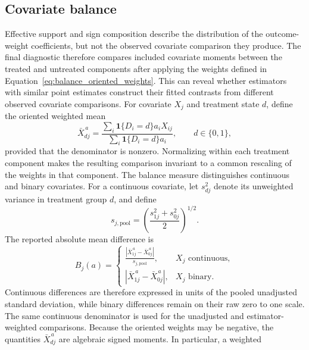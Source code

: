 \documentclass[12pt, a4paper, oneside]{article}
\theoremstyle{plain}
\theoremstyle{definition}
\begin{document}
\subsection{Covariate balance}
\label{subsec:covariate_balance}

Effective support and sign composition describe the distribution of the
outcome-weight coefficients, but not the observed covariate comparison they
produce. The final diagnostic therefore compares included covariate moments
between the treated and untreated components after applying the 
weights defined in Equation~\eqref{eq:balance_oriented_weights}. This can
reveal whether estimators with similar point estimates construct their fitted
contrasts from different observed covariate comparisons.
For covariate \(X_j\) and treatment state \(d\), define the oriented weighted
mean
\begin{equation}
    \bar X^{\,a}_{dj}
    =
    \frac{
      \sum_i\mathbf 1\{D_i=d\}a_iX_{ij}
    }{
      \sum_i\mathbf 1\{D_i=d\}a_i
    },
    \qquad d\in\{0,1\},
    \label{eq:signed_weighted_mean}
\end{equation}
provided that the denominator is nonzero. Normalizing within each treatment
component makes the resulting comparison invariant to a common rescaling of
the weights in that component.
The balance measure distinguishes continuous and binary covariates. For a
continuous covariate, let \(s_{dj}^2\) denote its unweighted variance in
treatment group \(d\), and define
\[
    s_{j,\mathrm{pool}}
    =
    \left(
      \frac{s_{1j}^2+s_{0j}^2}{2}
    \right)^{1/2}.
\]
The reported absolute mean difference is
\begin{equation}
    B_j(a)
    =
    \begin{cases}
      \displaystyle
      \frac{
        \left|
          \bar X^{\,a}_{1j}-\bar X^{\,a}_{0j}
        \right|
      }{
        s_{j,\mathrm{pool}}
      },
      & X_j \text{ continuous},\\[12pt]
      \left|
        \bar X^{\,a}_{1j}-\bar X^{\,a}_{0j}
      \right|,
      & X_j \text{ binary}.
    \end{cases}
    \label{eq:mixed_balance_measure}
\end{equation}
Continuous differences are therefore expressed in units of the pooled
unadjusted standard deviation, while binary differences remain on their raw
zero to one scale. The same continuous denominator is used for the unadjusted
and estimator-weighted comparisons.
Because the oriented weights may be negative, the quantities
\(\bar X^{\,a}_{dj}\) are algebraic signed moments. In particular, a weighted
\end{document}
